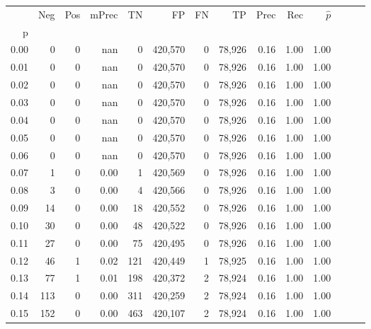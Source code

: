 \begin{tabular}{rrrrrrrrrrrrrr}
\toprule
{} &     Neg &    Pos & mPrec &       TN &       FP &      FN &      TP &  Prec &   Rec & $\hat{p}$ \\
p    &         &        &       &          &          &         &         &       &       &           \\
\midrule
0.00 &       0 &      0 &   nan &        0 &  420,570 &       0 &  78,926 &  0.16 &  1.00 &      1.00 \\
0.01 &       0 &      0 &   nan &        0 &  420,570 &       0 &  78,926 &  0.16 &  1.00 &      1.00 \\
0.02 &       0 &      0 &   nan &        0 &  420,570 &       0 &  78,926 &  0.16 &  1.00 &      1.00 \\
0.03 &       0 &      0 &   nan &        0 &  420,570 &       0 &  78,926 &  0.16 &  1.00 &      1.00 \\
0.04 &       0 &      0 &   nan &        0 &  420,570 &       0 &  78,926 &  0.16 &  1.00 &      1.00 \\
0.05 &       0 &      0 &   nan &        0 &  420,570 &       0 &  78,926 &  0.16 &  1.00 &      1.00 \\
0.06 &       0 &      0 &   nan &        0 &  420,570 &       0 &  78,926 &  0.16 &  1.00 &      1.00 \\
0.07 &       1 &      0 &  0.00 &        1 &  420,569 &       0 &  78,926 &  0.16 &  1.00 &      1.00 \\
0.08 &       3 &      0 &  0.00 &        4 &  420,566 &       0 &  78,926 &  0.16 &  1.00 &      1.00 \\
0.09 &      14 &      0 &  0.00 &       18 &  420,552 &       0 &  78,926 &  0.16 &  1.00 &      1.00 \\
0.10 &      30 &      0 &  0.00 &       48 &  420,522 &       0 &  78,926 &  0.16 &  1.00 &      1.00 \\
0.11 &      27 &      0 &  0.00 &       75 &  420,495 &       0 &  78,926 &  0.16 &  1.00 &      1.00 \\
0.12 &      46 &      1 &  0.02 &      121 &  420,449 &       1 &  78,925 &  0.16 &  1.00 &      1.00 \\
0.13 &      77 &      1 &  0.01 &      198 &  420,372 &       2 &  78,924 &  0.16 &  1.00 &      1.00 \\
0.14 &     113 &      0 &  0.00 &      311 &  420,259 &       2 &  78,924 &  0.16 &  1.00 &      1.00 \\
0.15 &     152 &      0 &  0.00 &      463 &  420,107 &       2 &  78,924 &  0.16 &  1.00 &      1.00 \\

\end{tabular}
